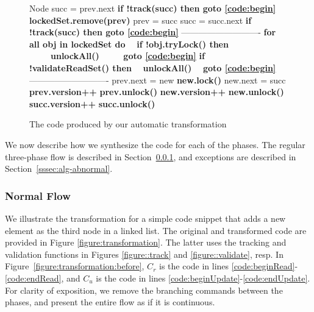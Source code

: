 \begin{figure*}
\begin{center}
\begin{subfigure}[b]{.45\textwidth}
\begin{algorithmic}[1]{}
{			\State{\spOne}Node succ = prev.next
			\State{\spOne}\textbf{if !track(succ) then {goto} \ref{code:begin}}  \label{code:readGhaseGoto2}
			\State{\spOne}\textbf{lockedSet.remove(prev)} \label{code:lockedSet:remove2}
			\State{\spZero}prev = succ
			\State{\spZero}succ = succ.next
			\State{\spZero}\textbf{if !track(succ) then {goto} \ref{code:begin}} \label{code:readGhaseGoto3}
			\Statex ----------------------------
			\State{\spZero}\textbf{for all obj in lockedSet do} \label{code:validateLockedSet}	
            \State{\spZero}\ \ \textbf{if !obj.tryLock() then}
            \State{\spZero}\ \ \ \ \ \textbf{unlockAll()}
            \State{\spZero}\ \ \ \ \ \textbf{{goto} \ref{code:begin}} \label{code:validateGoto1}
			\State{\spZero}\textbf{if !validateReadSet() then} 		\label{code:validateReadSet}
				\State{\spZero}\ \ \textbf{unlockAll()}
				\State{\spZero}\ \ \textbf{{goto} \ref{code:begin}} \label{code:validateGoto2}
			\Statex ----------------------------
			\State{\spZero}prev.next = new
			\State{\spZero}\textbf{new.lock()}
			\State{\spZero}new.next = succ			
			\State{\spZero}\textbf{prev.version++}
			\State{\spZero}\textbf{prev.unlock()}
			\State{\spZero}\textbf{new.version++}
			\State{\spZero}\textbf{new.unlock()}
			\State{\spZero}\textbf{succ.version++}
			\State{\spZero}\textbf{succ.unlock()}

			\EndFunction
			}
		\end{algorithmic}
		\caption{The code produced by our automatic transformation}\label{figure:transformation:after}
	\end{subfigure}
	\end{center}
\vspace{-4mm}
	\caption{Code example.
	The synchronization code is in bold.
			\label{figure:transformation}}
\end{figure*}

We now describe how we synthesize the code for each of the phases. The regular three-phase flow is described in
Section~\ref{sssec:alg-normal}, and exceptions are described in Section~\ref{sssec:alg-abnormal}.

\subsubsection{Normal Flow}
\label{sssec:alg-normal}

We illustrate the transformation for a simple code snippet that adds a new element as the third node in a linked list.
The original and transformed code are provided in Figure \ref{figure:transformation}. The latter uses
the tracking and validation functions in Figures \ref{figure::track} and
\ref{figure::validate}, resp.
In  Figure~\ref{figure:transformation:before}, $C_r$ is the code in lines \ref{code:beginRead}-\ref{code:endRead},
and $C_u$ is the code in lines \ref{code:beginUpdate}-\ref{code:endUpdate}.
For clarity of exposition, we remove the branching commands between the phases, and present the
entire flow as if it is continuous.

